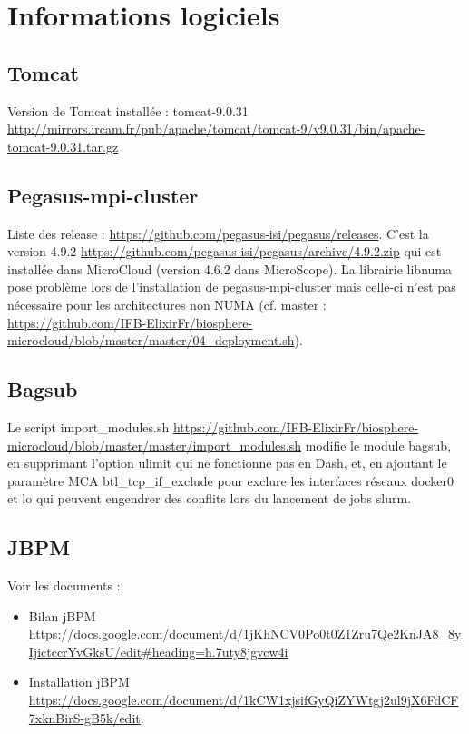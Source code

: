 \section{Informations logiciels}

\subsection{Tomcat}
Version de Tomcat installée : tomcat-9.0.31 \url {http://mirrors.ircam.fr/pub/apache/tomcat/tomcat-9/v9.0.31/bin/apache-tomcat-9.0.31.tar.gz}

\subsection{Pegasus-mpi-cluster}
Liste des release : \url{https://github.com/pegasus-isi/pegasus/releases}.
C'est la version 4.9.2 \url {https://github.com/pegasus-isi/pegasus/archive/4.9.2.zip} qui est installée dans MicroCloud (version 4.6.2 dans MicroScope).
La librairie libnuma pose problème lors de l'installation de pegasus-mpi-cluster mais celle-ci n'est pas nécessaire pour les architectures non NUMA (cf. master : \url{https://github.com/IFB-ElixirFr/biosphere-microcloud/blob/master/master/04_deployment.sh}).

\subsection{Bagsub}
Le script import\_modules.sh \url {https://github.com/IFB-ElixirFr/biosphere-microcloud/blob/master/master/import_modules.sh} modifie le module bagsub, en supprimant l'option ulimit qui ne fonctionne pas en Dash, et, en ajoutant le paramètre MCA btl\_tcp\_if\_exclude pour exclure les interfaces réseaux docker0 et lo qui peuvent engendrer des conflits lors du lancement de jobs slurm.

\subsection{JBPM}
Voir les documents :
\begin{itemize}
\item Bilan jBPM
 \url{https://docs.google.com/document/d/1jKhNCV0Po0t0Z1Zru7Qe2KnJA8_8yIjictccrYvGksU/edit#heading=h.7uty8jgvcw4i} 
\item Installation jBPM \url{https://docs.google.com/document/d/1kCW1xjsifGyQiZYWtgj2ul9jX6FdCF7xknBirS-gB5k/edit}{}.
\end{itemize}

